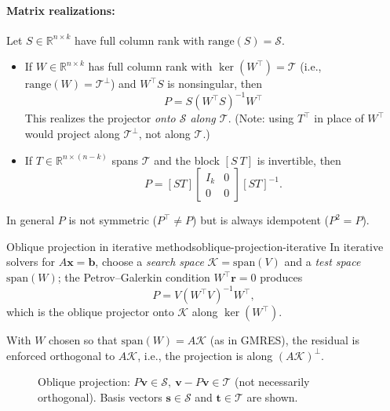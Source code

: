 \documentclass[../../main.tex]{subfiles}
\begin{document}
\paragraph{Matrix realizations:}
Let $S\in\mathbb R^{n\times k}$ have full column rank with $\mathrm{range}(S)=\mathcal{S}$.
\begin{itemize}
    \item If $W\in\mathbb R^{n\times k}$ has full column rank with $\ker(W^\top)=\mathcal{T}$ (i.e., $\mathrm{range}(W)=\mathcal{T}^\perp$) and $W^\top S$ is nonsingular, then
          \[
              P=S(W^\top S)^{-1}W^\top
          \]
          This realizes the projector \emph{onto $\mathcal{S}$ along $\mathcal{T}$}. (Note: using $T^\top$ in place of $W^\top$ would project along $\mathcal{T}^\perp$, not along $\mathcal{T}$.)
    \item If $T\in\mathbb R^{n\times(n-k)}$ spans $\mathcal{T}$ and the block $[S\ T]$ is invertible, then
          \[
              P=[ST]
              \begin{bmatrix}
                  I_k & 0 \\
                  0   & 0
              \end{bmatrix}
              [ST]^{-1}.
          \]
\end{itemize}
In general $P$ is not symmetric ($P^\top\neq P$) but is always idempotent ($P^2=P$).

\begin{example}{Oblique projection in iterative methods}{oblique-projection-iterative}
    In iterative solvers for $A\mathbf x=\mathbf b$, choose a \emph{search space} $\mathcal K=\mathrm{span}(V)$
    and a \emph{test space} $\mathrm{span}(W)$; the Petrov--Galerkin condition $W^\top\mathbf r=0$ produces
    \[
        P=V(W^\top V)^{-1}W^\top,
    \]
    which is the oblique projector onto $\mathcal K$ along $\ker(W^\top)$.

    With $W$ chosen so that $\mathrm{span}(W)=A\mathcal K$ (as in GMRES), the residual is enforced orthogonal to $A\mathcal K$, i.e., the projection is along $(A\mathcal K)^\perp$.
\end{example}

\begin{figure}[htb]
    \centering
    
    \caption{Oblique projection: \(P\mathbf{v}\in\mathcal{S},\ \mathbf{v}-P\mathbf{v}\in\mathcal{T}\) (not necessarily orthogonal). Basis vectors \(\mathbf{s} \in \mathcal{S}\) and \(\mathbf{t} \in \mathcal{T}\) are shown.}
    \label{fig:oblique-projection}
\end{figure}
\end{document}
